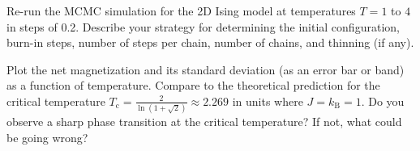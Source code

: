 \begin{problem}[20]
Re-run the MCMC simulation for the 2D Ising model at temperatures $T=1$ to $4$ in steps of 0.2.
Describe your strategy for determining the initial configuration, burn-in steps, number of steps per chain, number of chains, and thinning (if any).

Plot the net magnetization and its standard deviation (as an error bar or band) as a function of temperature.
Compare to the theoretical prediction for the critical temperature $T_\mathrm{c}=\frac{2}{\ln(1+\sqrt{2})}\approx 2.269$ in units where $J=k_\mathrm{B}=1$.
Do you observe a sharp phase transition at the critical temperature?
If not, what could be going wrong?
\end{problem}



